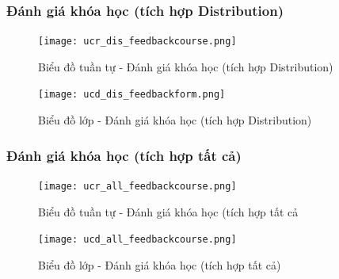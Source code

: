 \documentclass[./../main.tex]{subfiles}
\begin{document}
\subsubsection{Đánh giá khóa học (tích hợp Distribution)}
\begin{figure}[H]
    \centering
    \texttt{[image: ucr\_dis\_feedbackcourse.png]}
    \caption{Biểu đồ tuần tự - Đánh giá khóa học (tích hợp Distribution)}
\end{figure}
\begin{figure}[H]
    \centering
    \texttt{[image: ucd\_dis\_feedbackform.png]}
    \caption{Biểu đồ lớp - Đánh giá khóa học (tích hợp Distribution)}
\end{figure}
\subsubsection{Đánh giá khóa học (tích hợp tất cả)}
\begin{figure}[H]
    \centering
    \texttt{[image: ucr\_all\_feedbackcourse.png]}
    \caption{Biểu đồ tuần tự - Đánh giá khóa học (tích hợp tất cả}
\end{figure}
\begin{figure}[H]
    \centering
    \texttt{[image: ucd\_all\_feedbackcourse.png]}
    \caption{Biểu đồ lớp - Đánh giá khóa học (tích hợp tất cả)}
\end{figure}

\end{document}

